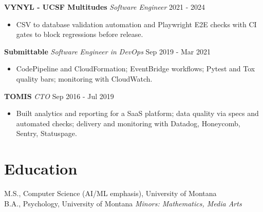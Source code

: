 \documentclass[10pt]{article}
\begin{document}
\noindent\textbf{VYNYL - UCSF Multitudes} \textit{Software Engineer}  \hfill 2021 - 2024\par
\begin{itemize}
  \item CSV to database validation automation and Playwright E2E checks with CI gates to block regressions before release.
\end{itemize}

\noindent\textbf{Submittable} \textit{Software Engineer in DevOps} \hfill Sep 2019 - Mar 2021\par
\begin{itemize}
  \item CodePipeline and CloudFormation; EventBridge workflows; Pytest and Tox quality bars; monitoring with CloudWatch.
\end{itemize}

\noindent\textbf{TOMIS} \textit{CTO} \hfill Sep 2016 - Jul 2019\par
\begin{itemize}
  \item Built analytics and reporting for a SaaS platform; data quality via specs and automated checks; delivery and monitoring with Datadog, Honeycomb, Sentry, Statuspage.
\end{itemize}

\section*{Education}
M.S., Computer Science (AI/ML emphasis), University of Montana \\
B.A., Psychology, University of Montana \quad \emph{Minors: Mathematics, Media Arts}
\end{document}
